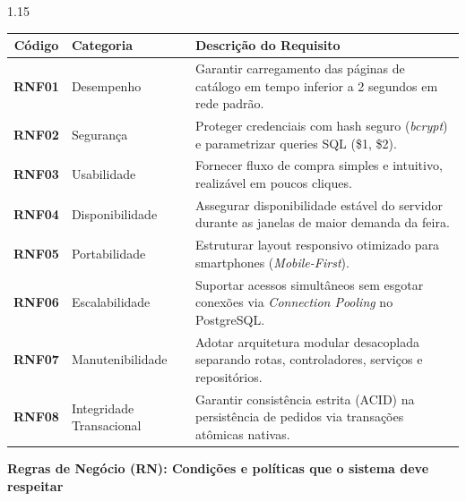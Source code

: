 \documentclass[12pt,a4paper]{article}
\begin{document}
\vspace{0.3cm}

\noindent
\begin{spacing}{1.15}
\begin{tabularx}{\textwidth}{|c|p{3.5cm}|X|}
\hline
\textbf{Código} & \textbf{Categoria} & \textbf{Descrição do Requisito} \\ \hline
\textbf{RNF01} & Desempenho & Garantir carregamento das páginas de catálogo em tempo inferior a 2 segundos em rede padrão. \\ \hline
\textbf{RNF02} & Segurança & Proteger credenciais com hash seguro (\textit{bcrypt}) e parametrizar queries SQL (\$1, \$2). \\ \hline
\textbf{RNF03} & Usabilidade & Fornecer fluxo de compra simples e intuitivo, realizável em poucos cliques. \\ \hline
\textbf{RNF04} & Disponibilidade & Assegurar disponibilidade estável do servidor durante as janelas de maior demanda da feira. \\ \hline
\textbf{RNF05} & Portabilidade & Estruturar layout responsivo otimizado para smartphones (\textit{Mobile-First}). \\ \hline
\textbf{RNF06} & Escalabilidade & Suportar acessos simultâneos sem esgotar conexões via \textit{Connection Pooling} no PostgreSQL. \\ \hline
\textbf{RNF07} & Manutenibilidade & Adotar arquitetura modular desacoplada separando rotas, controladores, serviços e repositórios. \\ \hline
\textbf{RNF08} & Integridade Transacional & Garantir consistência estrita (ACID) na persistência de pedidos via transações atômicas nativas. \\ \hline
\end{tabularx}
\end{spacing}

\newpage

\noindent \textbf{Regras de Negócio (RN): Condições e políticas que o sistema deve respeitar}

\vspace{0.3cm}
\end{document}
